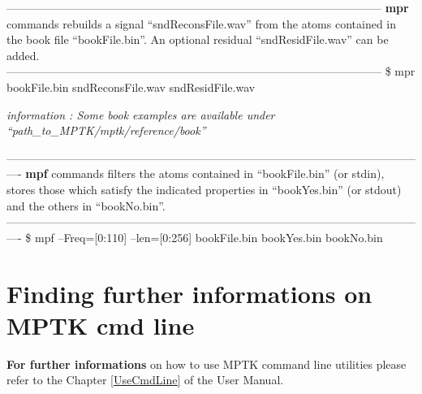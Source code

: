 \vspace{0.2 cm}

\noindent \textcolor[rgb]{0.4,0.4,0.4}{---------------------------------------------------------------------------------------------------\newline
\textbf{mpr} commands rebuilds a signal ``sndReconsFile.wav'' from the atoms contained in 
the book file ``bookFile.bin''. An optional residual ``sndResidFile.wav'' can be added.\newline                   
---------------------------------------------------------------------------------------------------\newline}
\$ mpr bookFile.bin sndReconsFile.wav sndResidFile.wav

\vspace{0.2 cm}

\noindent \emph{information : Some book examples are available under ``path\_to\_MPTK/mptk/reference/book''}

\vspace{0.1 cm}

\noindent \textcolor[rgb]{0.4,0.4,0.4}{----------------------------------------------------------------------------------------------------------------\newline
\textbf{mpf} commands filters the atoms contained in ``bookFile.bin'' (or stdin), stores those which 
satisfy the indicated properties in ``bookYes.bin'' (or stdout) and the others in ``bookNo.bin''.\newline
----------------------------------------------------------------------------------------------------------------\newline}
\$ mpf --Freq=[0:110] --len=[0:256] bookFile.bin bookYes.bin bookNo.bin

\section{Finding further informations on MPTK cmd line}

\textbf{For further informations} on how to use MPTK command line utilities please refer to the 
Chapter \ref{UseCmdLine} of the User Manual.